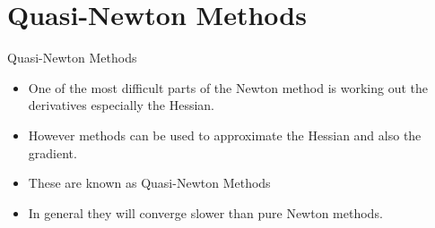 \documentclass[10pt]{beamer}
\begin{document}
                                                                                              \section{Quasi-Newton Methods}
                                                                                              \begin{frame}{Quasi-Newton Methods}
                                                                                                \begin{itemize}
                                                                                                \item One of the most difficult parts of the Newton method is working out the derivatives especially the Hessian.

                                                                                                \item However methods can be used to approximate the Hessian and also the gradient.

                                                                                                \item These are known as Quasi-Newton Methods

                                                                                                \item In general they will converge slower than pure Newton methods.
                                                                                                \end{itemize}
                                                                                              \end{frame}
\end{document}
